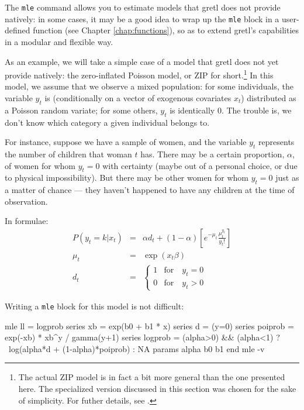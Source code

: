 The \texttt{mle} command allows you to estimate models that
gretl does not provide natively: in some cases, it may be a good
idea to wrap up the \texttt{mle} block in a user-defined function (see
Chapter \ref{chap:functions}), so as to extend gretl's
capabilities in a modular and flexible way.

As an example, we will take a simple case of a model that gretl
does not yet provide natively: the zero-inflated Poisson model, or ZIP
for short.\footnote{The actual ZIP model is in fact a bit more general
than the one presented here. The specialized version discussed in this
section was chosen for the sake of simplicity. For futher details, see
\cite{greene03}.} In this model, we assume that we observe a mixed
population: for some individuals, the variable $y_t$ is (conditionally
on a vector of exogenous covariates $x_t$) distributed as a Poisson
random variate; for some others, $y_t$ is identically 0. The trouble
is, we don't know which category a given individual belongs to.  

For instance, suppose we have a sample of women, and the variable $y_t$
represents the number of children that woman $t$ has. There may be a
certain proportion, $\alpha$, of women for whom $y_t = 0$ with certainty
(maybe out of a personal choice, or due to physical impossibility). 
But there may be other women for whom $y_t = 0$ just as a matter of
chance --- they haven't happened to have any children at the time
of observation.

In formulae:
\begin{eqnarray*}
  P(y_t = k | x_t) & = & \alpha d_t + (1 - \alpha) 
  \left[e^{-\mu_t} \frac{\mu_t^{y_t}}{y_t!}\right] \\
    \mu_t & = & \exp(x_t \beta) \\
    d_t & = & 
    \left\{ 
      \begin{array}{ll} 
        1 & \mathrm{for} \quad y_t = 0 \\ 
        0 & \mathrm{for} \quad y_t > 0 
      \end{array}
    \right. 
\end{eqnarray*}

Writing a \texttt{mle} block for this model is not difficult:
\begin{code}
mle ll = logprob
  series xb = exp(b0 + b1 * x)
  series d = (y=0)
  series poiprob = exp(-xb) * xb^y / gamma(y+1)
  series logprob = (alpha>0) && (alpha<1) ? \
    log(alpha*d + (1-alpha)*poiprob) : NA
  params alpha b0 b1
end mle -v
\end{code}

